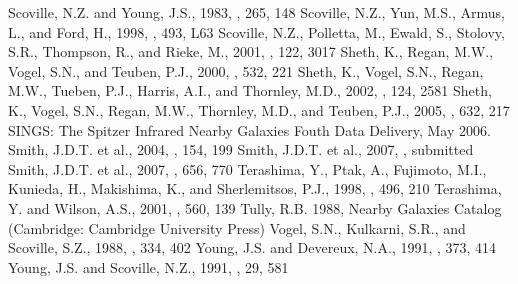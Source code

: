 \documentclass[manuscript]{aastex}
\begin{document}
\begin{thebibliography}{}
 Scoville, N.Z. and Young, J.S., 1983, \aj, 265, 148
 Scoville, N.Z., Yun, M.S., Armus, L., and Ford, H., 1998, \apj, 493, L63 
 Scoville, N.Z., Polletta, M., Ewald, S., Stolovy, S.R., Thompson, R., and Rieke, M., 2001, \aj, 122, 3017
 Sheth, K., Regan, M.W., Vogel, S.N., and Teuben, P.J., 2000, \apj, 532, 221 
 Sheth, K., Vogel, S.N., Regan, M.W., Tueben, P.J., Harris, A.I., and Thornley, M.D., 2002, \aj, 124, 2581
 Sheth, K., Vogel, S.N., Regan, M.W., Thornley, M.D., and Teuben, P.J., 2005, \apj, 632, 217
 SINGS: The Spitzer Infrared Nearby Galaxies Fouth Data Delivery, May 2006.
 Smith, J.D.T. et al., 2004, \apjs, 154, 199
 Smith, J.D.T. et al., 2007, \pasp, submitted
 Smith, J.D.T. et al., 2007, \apj, 656, 770
 Terashima, Y., Ptak, A., Fujimoto, M.I., Kunieda, H., Makishima, K., and Sherlemitsos, P.J., 1998, \apj, 496, 210
 Terashima, Y. and Wilson, A.S., 2001, \apj, 560, 139
 Tully, R.B. 1988, Nearby Galaxies Catalog (Cambridge: Cambridge University Press)
 Vogel, S.N., Kulkarni, S.R., and Scoville, S.Z., 1988, \nat, 334, 402
 Young, J.S. and Devereux, N.A., 1991, \apj, 373, 414
 Young, J.S. and Scoville, N.Z., 1991, \araa, 29, 581
\end{thebibliography}

\clearpage

\begin{figure}
 \end{figure}
 \clearpage
 
\end{document}
